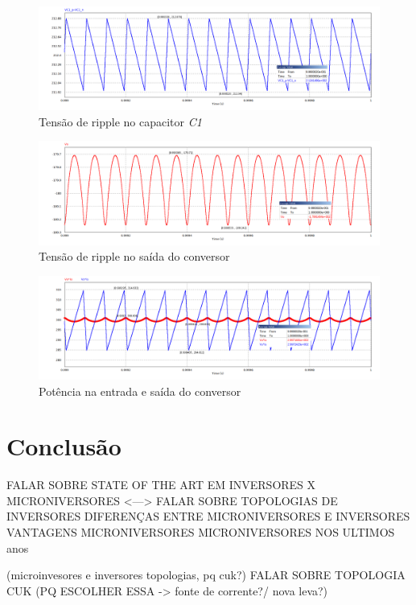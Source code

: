 \documentclass[
	12pt,				%
	openright,			%
	onseside,
	a4paper,			%
	english,			%
	french,				%
	spanish,			%
	brazil,				%
	]{abntex2}
\begin{document}
\begin{figure}[]%
	\centering
		\includegraphics[width=0.8 \linewidth]{cuk_conv_ripp_V_C1}
		\caption{Tensão de ripple no capacitor \emph{C1}}
		\label{fig:cuk_conv_ripp_V_C1}
\end{figure}

\begin{figure}[]%
	\centering
		\includegraphics[width=0.8 \linewidth]{cuk_conv_ripp_V_out}
		\caption{Tensão de ripple no saída do conversor}
		\label{fig:cuk_conv_ripp_I_out}
\end{figure}

\begin{figure}[]%
	\centering
		\includegraphics[width=0.8 \linewidth]{cuk_conv_power_sign}
		\caption{Potência na entrada e saída do conversor}
		\label{fig:cuk_conv_power_sign}
\end{figure}



\chapter{Conclusão}

FALAR SOBRE  STATE OF THE ART EM INVERSORES X MICRONIVERSORES <---> FALAR SOBRE TOPOLOGIAS DE INVERSORES
DIFERENÇAS ENTRE MICRONIVERSORES E INVERSORES
VANTAGENS MICRONIVERSORES
MICRONIVERSORES NOS ULTIMOS anos

(microinvesores e inversores topologias, pq cuk?)
FALAR SOBRE TOPOLOGIA CUK (PQ ESCOLHER ESSA -> fonte de corrente?/ nova leva?)
\end{document}
